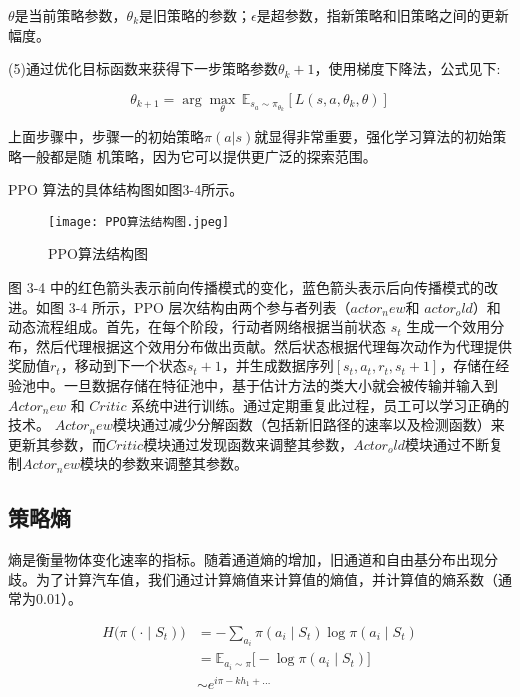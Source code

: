 \(𝜃\)是当前策略参数，\(𝜃_𝑘\)是旧策略的参数；\(𝜖\)是超参数，指新策略和旧策略之间的更新幅度。

(5)通过优化目标函数来获得下一步策略参数\(𝜃_𝑘+1\)，使用梯度下降法，公式见下:

\begin{equation}
	\theta_{k+1} = \arg\max_{\theta} \, \mathbb{E}_{s_a \sim \pi_{\theta_k}} \left[ L(s, a, \theta_k, \theta) \right]
\end{equation}

上面步骤中，步骤一的初始策略\(𝜋(𝑎|𝑠)\)就显得非常重要，强化学习算法的初始策略一般都是随
机策略，因为它可以提供更广泛的探索范围。

PPO 算法的具体结构图\cite{YYKX202405015}如图3-4所示。

\begin{figure}[hbt]
	\centering
	\texttt{[image: PPO算法结构图.jpeg]}
	\caption{PPO算法结构图}
	\label{f.example}
\end{figure}

图 3-4 中的红色箭头表示前向传播模式的变化，蓝色箭头表示后向传播模式的改进。如图 3-4 所示，PPO 层次结构由两个参与者列表（\(actor_new\)和 \(actor_old）\)和动态流程组成。首先，在每个阶段，行动者网络根据当前状态 \(s_t\) 生成一个效用分布，然后代理根据这个效用分布做出贡献。然后状态根据代理每次动作为代理提供奖励值\(r_t\)，移动到下一个状态\(s_t+1\)，并生成数据序列\([s_t,a_t,r_t,s_t+1]\)，存储在经验池中。一旦数据存储在特征池中，基于估计方法的类大小就会被传输并输入到 \(Actor_new\) 和 \(Critic\) 系统中进行训练。通过定期重复此过程，员工可以学习正确的技术。 \(Actor_new\)模块通过减少分解函数（包括新旧路径的速率以及检测函数）来更新其参数，而\(Critic\)模块通过发现函数来调整其参数，\(Actor_old\)模块通过不断复制\(Actor_new\)模块的参数来调整其参数。

\subsection{策略熵}

熵是衡量物体变化速率的指标。随着通道熵的增加，旧通道和自由基分布出现分歧。为了计算汽车值，我们通过计算熵值\cite{tucker2018mirage}来计算值的熵值，并计算值的熵系数（通常为0.01）。

\begin{align}
	H\big(\pi(\cdot \mid S_t)\big) &= -\sum_{a_i} \pi(a_i \mid S_t) \log \pi(a_i \mid S_t) \\
	&= \mathbb{E}_{a_i \sim \pi} \Big[ -\log \pi(a_i \mid S_t) \Big] \\
	&\sim e^{i\pi - k h_1 + \dots}
\end{align}

